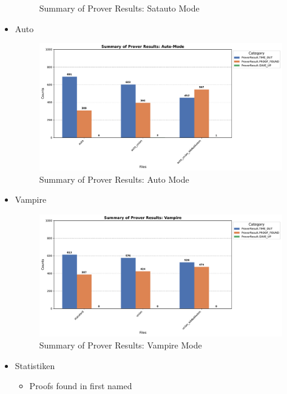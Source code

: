 \documentclass[german,version-2020-11]{uzl-thesis}
\begin{document}
\begin{itemize}
\begin{figure}[h!]
      \caption{Summary of Prover Results: Satauto Mode}
      \label{fig:prover_results_satauto}
    \end{figure}
    \clearpage
    \item Auto
    \begin{figure}[h!]
      \centering
      \includegraphics[width=\textwidth]{auto_mode_output.pdf} %
      \caption{Summary of Prover Results: Auto Mode}
      \label{fig:prover_results_auto}
    \end{figure}
    \clearpage
    \item Vampire
    \begin{figure}[h!]
      \centering
      \includegraphics[width=\textwidth]{vampire_mode_output.pdf} %
      \caption{Summary of Prover Results: Vampire Mode}
      \label{fig:prover_results_vampire}
    \end{figure}
    \clearpage
    \item Statistiken
      \begin{itemize}
        \item Proofs found in first named
        \begin{figure}[h!]
          \centering

\end{figure}
\end{itemize}
\end{itemize}
\end{document}
